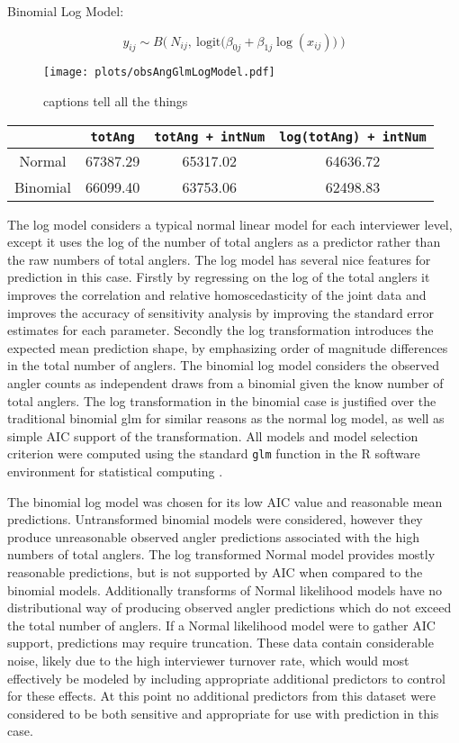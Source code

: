 \documentclass[12pt,]{article}
\begin{document}
Binomial Log Model:

\begin{equation}
y_{ij} \sim B\Big( ~N_{ij}, ~\text{logit}\big(\beta_{0j} + \beta_{1j} \log(x_{ij})\big)~ \Big)
\end{equation}

\begin{figure}[htbp]
\centering
\texttt{[image: plots/obsAngGlmLogModel.pdf]}
\caption{captions tell all the things \label{obsAngLogModel}}
\end{figure}

\begin{longtable}[c]{@{}cccc@{}}
\toprule
& \verb|totAng| & \verb|totAng + intNum| &
\verb|log(totAng) + intNum|\tabularnewline
\midrule
\endhead
Normal & 67387.29 & 65317.02 & 64636.72\tabularnewline
Binomial & 66099.40 & 63753.06 & 62498.83\tabularnewline
\bottomrule
\end{longtable}

The log model considers a typical normal linear model for each
interviewer level, except it uses the log of the number of total anglers
as a predictor rather than the raw numbers of total anglers. The log
model has several nice features for prediction in this case. Firstly by
regressing on the log of the total anglers it improves the correlation
and relative homoscedasticity of the joint data and improves the
accuracy of sensitivity analysis by improving the standard error
estimates for each parameter. Secondly the log transformation introduces
the expected mean prediction shape, by emphasizing order of magnitude
differences in the total number of anglers. The binomial log model
considers the observed angler counts as independent draws from a
binomial given the know number of total anglers. The log transformation
in the binomial case is justified over the traditional binomial glm for
similar reasons as the normal log model, as well as simple AIC support
of the transformation. All models and model selection criterion were
computed using the standard \verb|glm| function in the R software
environment for statistical computing \cite{rBase}.

The binomial log model was chosen for its low AIC value and reasonable
mean predictions. Untransformed binomial models were considered, however
they produce unreasonable observed angler predictions associated with
the high numbers of total anglers. The log transformed Normal model
provides mostly reasonable predictions, but is not supported by AIC when
compared to the binomial models. Additionally transforms of Normal
likelihood models have no distributional way of producing observed
angler predictions which do not exceed the total number of anglers. If a
Normal likelihood model were to gather AIC support, predictions may
require truncation. These data contain considerable noise, likely due to
the high interviewer turnover rate, which would most effectively be
modeled by including appropriate additional predictors to control for
these effects. At this point no additional predictors from this dataset
were considered to be both sensitive and appropriate for use with
prediction in this case.
\end{document}
